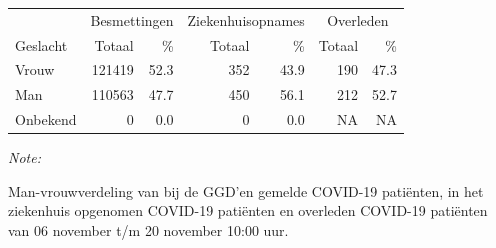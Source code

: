 \documentclass[
  english,
  man,floatsintext]{apa6}
\begin{document}
\begin{table}
\centering\begingroup\fontsize{11}{13}\selectfont

\begin{threeparttable}
\begin{tabular}{lrrrrrr}
\toprule
\multicolumn{1}{c}{ } & \multicolumn{2}{c}{Besmettingen} & \multicolumn{2}{c}{Ziekenhuisopnames} & \multicolumn{2}{c}{Overleden} \\
\cmidrule(l{3pt}r{3pt}){2-3} \cmidrule(l{3pt}r{3pt}){4-5} \cmidrule(l{3pt}r{3pt}){6-7}
Geslacht & Totaal & \% & Totaal & \% & Totaal & \%\\
\midrule
Vrouw & 121419 & 52.3 & 352 & 43.9 & 190 & 47.3\\
Man & 110563 & 47.7 & 450 & 56.1 & 212 & 52.7\\
Onbekend & 0 & 0.0 & 0 & 0.0 & NA & NA\\
\bottomrule
\end{tabular}
\begin{tablenotes}
\item \textit{Note: } 
\item Man-vrouwverdeling van bij de GGD’en gemelde COVID-19 patiënten, in het ziekenhuis opgenomen COVID-19 patiënten en overleden COVID-19 patiënten van 06 november t/m 20 november 10:00 uur.
\end{tablenotes}
\end{threeparttable}
\endgroup{}
\end{table}
\newpage
\end{document}
